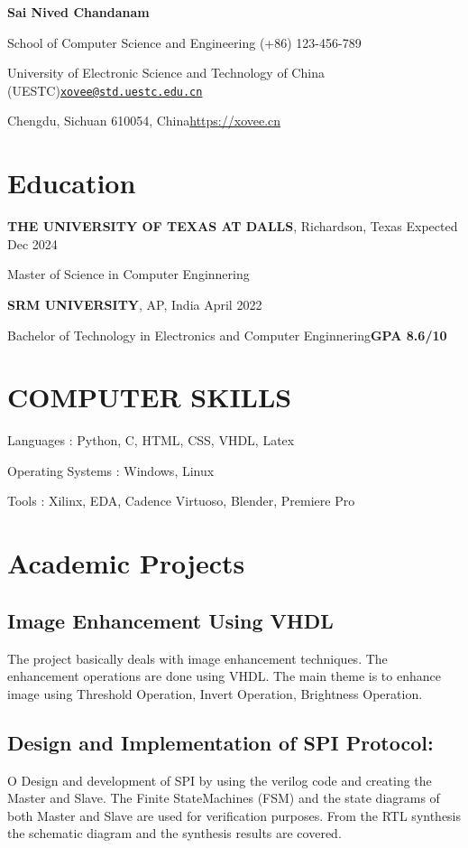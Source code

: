 \documentclass{article}
\newcommand{\cvsection}[1]{\section*{\rmfamily#1}}
\newcommand{\cvsubsection}[1]{\subsection*{\rmfamily\hspace{1.6em}#1}}
\begin{document}
\begin{center}
    \Huge{
    \rmfamily
    \textbf{Sai Nived Chandanam}}
\end{center}
\vspace{20pt}


\setlength{\parskip}{1pt}
\renewcommand{\arraystretch}{1.25}


\noindent School of Computer Science and Engineering \hfill (+86) 123-456-789

\noindent University of Electronic Science and Technology of China (UESTC)\hfill \href{mailto:xovee@std.uestc.edu.cn}{\texttt{xovee@std.uestc.edu.cn}}

\noindent Chengdu, Sichuan 610054, China\hfill \url{https://xovee.cn}


\setlength{\parskip}{3pt}



\cvsection{Education}
\indent

\textbf{THE UNIVERSITY OF TEXAS AT DALLS}, Richardson, Texas \hfill Expected Dec 2024

Master of Science in Computer Enginnering

\indent

\textbf{SRM UNIVERSITY}, AP, India \hfill April 2022

Bachelor of Technology in Electronics and Computer Enginnering\hfill\textbf{GPA 8.6/10}

\cvsection{COMPUTER SKILLS}
\indent

Languages :  Python, C, HTML, CSS, VHDL, Latex

Operating Systems : Windows, Linux

Tools : Xilinx, EDA, Cadence Virtuoso, Blender, Premiere Pro



\cvsection{Academic Projects}

\cvsubsection{Image Enhancement Using VHDL}

The project basically deals with image enhancement techniques. The enhancement operations are done using VHDL. The main theme is to enhance image using Threshold Operation, Invert Operation, Brightness Operation.


\cvsubsection{Design and Implementation of SPI Protocol:}
\indent

O Design and development of SPI by using the verilog code and creating the Master and Slave. The Finite StateMachines (FSM) and the state diagrams of both Master and Slave are used for verification purposes. From the RTL synthesis the schematic diagram and the synthesis results are covered.
\end{document}
